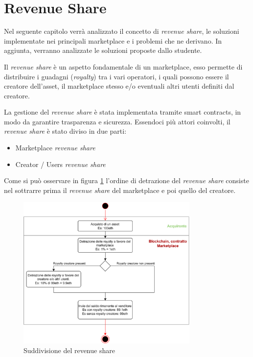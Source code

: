 \section{Revenue Share}
\label{sec:revenue-share}
Nel seguente capitolo verrà analizzato il concetto di \textit{revenue share}, le soluzioni implementate nei principali marketplace e i problemi che ne derivano. In aggiunta, verranno analizzate le soluzioni proposte dallo studente.

Il \textit{revenue share} è un aspetto fondamentale di un marketplace, esso permette di distribuire i guadagni (\textit{royalty}) tra i vari operatori, i quali possono essere il creatore dell'asset, il marketplace stesso e/o eventuali altri utenti definiti dal creatore.

La gestione del \textit{revenue share} è stata implementata tramite smart contracts, in modo da garantire trasparenza e sicurezza. 
Essendoci più attori coinvolti, il \textit{revenue share} è stato diviso in due parti:

\begin{itemize}
    \item Marketplace \textit{revenue share}
    \item Creator / Users \textit{revenue share}
\end{itemize}

Come si può osservare in figura \ref{fig:distribuzione-royalty} l'ordine di detrazione del \textit{revenue share} consiste nel sottrarre prima il \textit{revenue share} del marketplace e poi quello del creatore. 

\begin{figure}[H]
    \centering
    \includegraphics[width=0.8\textwidth]{images/SuddivisioneRoyalty.png}
    \caption{Suddivisione del revenue share}
    \label{fig:distribuzione-royalty}
\end{figure}



